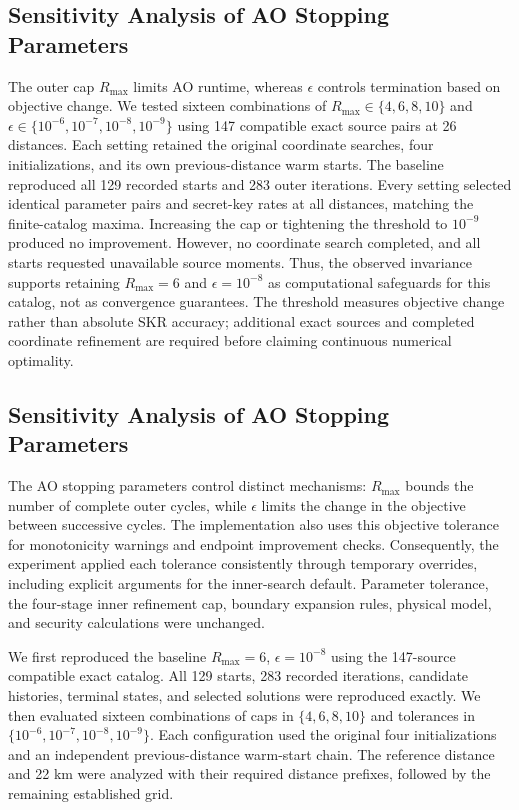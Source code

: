 \subsection{Sensitivity Analysis of AO Stopping Parameters}
The outer cap $R_{\max}$ limits AO runtime, whereas $\epsilon$ controls termination based on objective change. We tested sixteen combinations of $R_{\max}\in\{4,6,8,10\}$ and $\epsilon\in\{10^{-6},10^{-7},10^{-8},10^{-9}\}$ using 147 compatible exact source pairs at 26 distances. Each setting retained the original coordinate searches, four initializations, and its own previous-distance warm starts. The baseline reproduced all 129 recorded starts and 283 outer iterations. Every setting selected identical parameter pairs and secret-key rates at all distances, matching the finite-catalog maxima. Increasing the cap or tightening the threshold to $10^{-9}$ produced no improvement. However, no coordinate search completed, and all starts requested unavailable source moments. Thus, the observed invariance supports retaining $R_{\max}=6$ and $\epsilon=10^{-8}$ as computational safeguards for this catalog, not as convergence guarantees. The threshold measures objective change rather than absolute SKR accuracy; additional exact sources and completed coordinate refinement are required before claiming continuous numerical optimality.

\subsection{Sensitivity Analysis of AO Stopping Parameters}
The AO stopping parameters control distinct mechanisms: $R_{\max}$ bounds the number of complete outer cycles, while $\epsilon$ limits the change in the objective between successive cycles. The implementation also uses this objective tolerance for monotonicity warnings and endpoint improvement checks. Consequently, the experiment applied each tolerance consistently through temporary overrides, including explicit arguments for the inner-search default. Parameter tolerance, the four-stage inner refinement cap, boundary expansion rules, physical model, and security calculations were unchanged.

We first reproduced the baseline $R_{\max}=6$, $\epsilon=10^{-8}$ using the 147-source compatible exact catalog. All 129 starts, 283 recorded iterations, candidate histories, terminal states, and selected solutions were reproduced exactly. We then evaluated sixteen combinations of caps in $\{4,6,8,10\}$ and tolerances in $\{10^{-6},10^{-7},10^{-8},10^{-9}\}$. Each configuration used the original four initializations and an independent previous-distance warm-start chain. The reference distance and 22 km were analyzed with their required distance prefixes, followed by the remaining established grid.

